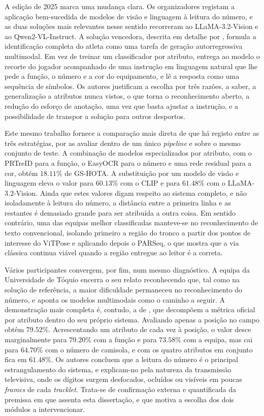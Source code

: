A edição de 2025 marca uma mudança clara. Os organizadores registam a aplicação
bem-sucedida de modelos de visão e linguagem à leitura do número, e as duas soluções mais
relevantes nesse sentido recorreram ao LLaMA-3.2-Vision e ao Qwen2-VL-Instruct. A solução
vencedora, descrita em detalhe por \citet{oo2026broadcast2pitch}, formula a identificação
completa do atleta como uma tarefa de geração autorregressiva multimodal. Em vez de treinar
um classificador por atributo, entrega ao modelo o recorte do jogador acompanhado de uma
instrução em linguagem natural que lhe pede a função, o número e a cor do equipamento, e lê
a resposta como uma sequência de símbolos. Os autores justificam a escolha por três razões,
a saber, a generalização a atributos nunca vistos, o que torna o reconhecimento aberto, a
redução do esforço de anotação, uma vez que basta ajustar a instrução, e a possibilidade de
transpor a solução para outros desportos.

Este mesmo trabalho fornece a comparação mais direta de que há registo entre as três
estratégias, por as avaliar dentro de um único \emph{pipeline} e sobre o mesmo conjunto de
teste. A combinação de modelos especializados por atributo, com o PRTreID para a função, o
EasyOCR para o número e uma rede residual para a cor, obtém $18{.}11\%$ de GS-HOTA. A
substituição por um modelo de visão e linguagem eleva o valor para $60{.}13\%$ com o CLIP e
para $61{.}48\%$ com o LLaMA-3.2-Vision. Ainda que estes valores digam respeito ao sistema
completo, e não isoladamente à leitura do número, a distância entre a primeira linha e as
restantes é demasiado grande para ser atribuída a outra coisa. Em sentido contrário, uma
das equipas melhor classificadas manteve-se no reconhecimento de texto convencional,
isolando primeiro a região do tronco a partir dos pontos de interesse do ViTPose e
aplicando depois o PARSeq, o que mostra que a via clássica continua viável quando a região
entregue ao leitor é a correta.

Vários participantes convergem, por fim, num mesmo diagnóstico. A equipa da Universidade de
Tóquio encerra o seu relato reconhecendo que, tal como na solução de referência, a maior
dificuldade permaneceu no reconhecimento do número, e aponta os modelos multimodais como o
caminho a seguir. A demonstração mais completa é, contudo, a de \citet{oo2026broadcast2pitch},
que decompõem a métrica oficial por atributo dentro do seu próprio sistema. Avaliando apenas
a posição no campo obtêm $79{.}52\%$. Acrescentando um atributo de cada vez à posição, o
valor desce marginalmente para $79{.}20\%$ com a função e para $73{.}58\%$ com a equipa, mas
cai para $64{.}70\%$ com o número de camisola, e com os quatro atributos em conjunto fica em
$61{.}48\%$. Os autores concluem que a leitura do número é o principal estrangulamento do
sistema, e explicam-no pela natureza da transmissão televisiva,
onde os dígitos surgem desfocados, ocluídos ou visíveis em poucas \emph{frames} de cada
\emph{tracklet}. Trata-se de confirmação externa e quantificada da premissa em que assenta
esta dissertação, e que motiva a escolha dos dois módulos a intervencionar.

